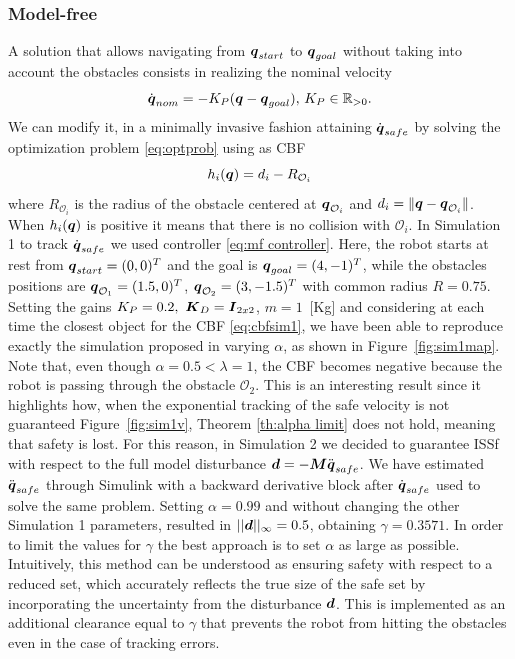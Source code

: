 \subsubsection{Model-free}
A solution that allows navigating from ${\boldsymbol{q}}_{start}$ to ${\boldsymbol{q}}_{goal}$ without taking into account the obstacles consists in realizing the nominal velocity   
\begin{equation}
    \dot{{\boldsymbol{q}}}_{nom}=-K_P({\boldsymbol{q}} - {\boldsymbol{q}}_{goal}),\,K_P\in\mathbb{R}_{>0}.
\end{equation}
We can modify it, in a minimally invasive fashion attaining $\dot{\boldsymbol{q}}_{safe}$ by solving the optimization problem \eqref{eq:optprob} using as CBF
\begin{equation}\label{eq:cbfsim1}
h_i({\boldsymbol{q}})=d_{i}-R_{\mathcal{O}_i}
\end{equation}
 where $R_{\mathcal{O}_i}$ is the radius of the obstacle centered at ${\boldsymbol{q}}_{\mathcal{O}_i}$ and $d_{i} = \lVert {\boldsymbol{q}}-{\boldsymbol{q}}_{\mathcal{O}_i} \rVert$.
When $h_i({\boldsymbol{q}})$ is positive it means that there is no collision with $\mathcal{O}_i$.
In Simulation 1 to track $\dot{\boldsymbol{q}}_{safe}$ we used controller \eqref{eq:mf controller}. Here, the robot starts at rest from ${\boldsymbol{q}}_{start}=(0,0)^T$ and the goal is ${\boldsymbol{q}}_{goal}=(4,-1)^T$, while the obstacles positions are ${\boldsymbol{q}}_{\mathcal{O}_1}=(1.5,0)^T$, ${\boldsymbol{q}}_{\mathcal{O}_2}=(3,-1.5)^T$ with common radius $R=0.75$. Setting the gains $K_P = 0.2,~\boldsymbol{K}_D=\boldsymbol{I}_{2x2}$, $m=1$~[Kg] and considering at each time the closest object for the CBF \eqref{eq:cbfsim1}, we have been able to reproduce exactly the simulation proposed in \cite{mfcbf} varying $\alpha$, as shown in Figure~\ref{fig:sim1map}.
Note that, even though $\alpha=0.5 < \lambda = 1$, the CBF becomes negative because the robot is passing through the obstacle $\mathcal{O}_2$. This is an interesting result since it highlights how, when the exponential tracking of the safe velocity is not guaranteed Figure~\ref{fig:sim1v}, Theorem \ref{th:alpha limit} does not hold, meaning that safety is lost. 
For this reason, in Simulation 2 we decided to guarantee ISSf with respect to the full model disturbance $\boldsymbol{d} = -\boldsymbol{M}\ddot{{\boldsymbol{q}}}_{safe}$. We have estimated $\ddot{\boldsymbol{q}}_{safe}$ through Simulink with a backward derivative block after $\dot{\boldsymbol{q}}_{safe}$ used to solve the same problem. Setting $\alpha=0.99$ and without changing the other Simulation 1 parameters, resulted in $||\boldsymbol{d}||_\infty = 0.5$, obtaining $\gamma = 0.3571$. In order to limit the values for $\gamma$ the best approach is to set $\alpha$ as large as possible. Intuitively, this method can be understood as ensuring safety with respect to a reduced set, which accurately reflects the true size of the safe set by incorporating the uncertainty from the disturbance $\boldsymbol{d}$. This is implemented as an additional clearance equal to $\gamma$ that prevents the robot from hitting the obstacles even in the case of tracking errors. 
